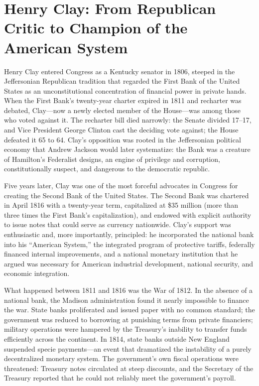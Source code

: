 \documentclass[12pt]{article}
\begin{document}
\section{Henry Clay: From Republican Critic to Champion of the American
         System}

Henry Clay entered Congress as a Kentucky senator in 1806, steeped in
the Jeffersonian Republican tradition that regarded the First Bank of
the United States as an unconstitutional concentration of financial power
in private hands.  When the First Bank's twenty-year charter expired in
1811 and recharter was debated, Clay---now a newly elected member of the
House---was among those who voted against it.  The recharter bill died
narrowly: the Senate divided 17--17, and Vice President George Clinton
cast the deciding vote against; the House defeated it 65 to 64.  Clay's
opposition was rooted in the Jeffersonian political economy that Andrew
Jackson would later systematize: the Bank was a creature of Hamilton's
Federalist designs, an engine of privilege and corruption, constitutionally
suspect, and dangerous to the democratic republic.

Five years later, Clay was one of the most forceful advocates in Congress
for creating the Second Bank of the United States.  The Second Bank was
chartered in April 1816 with a twenty-year term, capitalized at \$35
million (more than three times the First Bank's capitalization), and
endowed with explicit authority to issue notes that could serve as
currency nationwide.  Clay's support was enthusiastic and, more
importantly, principled: he incorporated the national bank into his
``American System,'' the integrated program of protective tariffs,
federally financed internal improvements, and a national monetary
institution that he argued was necessary for American industrial
development, national security, and economic integration.

What happened between 1811 and 1816 was the War of 1812.  In the
absence of a national bank, the Madison administration found it nearly
impossible to finance the war.  State banks proliferated and issued paper
with no common standard; the government was reduced to borrowing at
punishing terms from private financiers; military operations were
hampered by the Treasury's inability to transfer funds efficiently across
the continent.  In 1814, state banks outside New England suspended specie
payments---an event that dramatized the instability of a purely
decentralized monetary system.  The government's own fiscal operations
were threatened: Treasury notes circulated at steep discounts, and the
Secretary of the Treasury reported that he could not reliably meet
the government's payroll.
\end{document}
